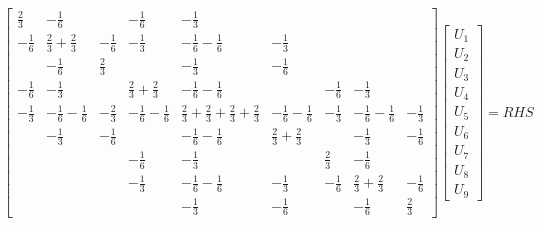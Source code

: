 \begin{equation}
  \begin{bmatrix}
    \frac{2}{3} &-\frac{1}{6} &\frac{}{} &-\frac{1}{6} 
          &-\frac{1}{3} 
          &\frac{}{} &\frac{}{} &\frac{}{} &\frac{}{} \\
    -\frac{1}{6} &\frac{2}{3}+\frac{2}{3} &-\frac{1}{6} &-\frac{1}{3} 
          &-\frac{1}{6}-\frac{1}{6} 
          &-\frac{1}{3} &\frac{}{} &\frac{}{} &\frac{}{} \\
    \frac{}{} &-\frac{1}{6} &\frac{2}{3} &\frac{}{} 
          &-\frac{1}{3} 
          &-\frac{1}{6} &\frac{}{} &\frac{}{} &\frac{}{} \\
    -\frac{1}{6} &-\frac{1}{3} &\frac{}{} &\frac{2}{3}+\frac{2}{3} 
          &-\frac{1}{6}-\frac{1}{6} 
          &\frac{}{} &-\frac{1}{6} &-\frac{1}{3} &\frac{}{} \\
    -\frac{1}{3} &-\frac{1}{6}-\frac{1}{6} &-\frac{2}{3} &-\frac{1}{6}-\frac{1}{6} 
          & \frac{2}{3}+\frac{2}{3}+\frac{2}{3}+\frac{2}{3} 
          & -\frac{1}{6}-\frac{1}{6}
          &-\frac{1}{3} &-\frac{1}{6}-\frac{1}{6} &-\frac{1}{3} \\
    \frac{}{} &-\frac{1}{3} &-\frac{1}{6} &\frac{}{} 
          &-\frac{1}{6}-\frac{1}{6}
          &\frac{2}{3}+\frac{2}{3} &\frac{}{} &-\frac{1}{3} &-\frac{1}{6} \\
    \frac{}{} &\frac{}{} &\frac{}{} &-\frac{1}{6} 
          &-\frac{1}{3} 
          &\frac{}{} &\frac{2}{3} &-\frac{1}{6} &\frac{}{} \\
    \frac{}{} &\frac{}{} &\frac{}{} &-\frac{1}{3} 
          &-\frac{1}{6}-\frac{1}{6} 
          &-\frac{1}{3} &-\frac{1}{6} &\frac{2}{3}+\frac{2}{3} &-\frac{1}{6} \\
    \frac{}{} &\frac{}{} &\frac{}{} &\frac{}{} 
          &-\frac{1}{3} 
          &-\frac{1}{6} &\frac{}{} &-\frac{1}{6} &\frac{2}{3}
  \end{bmatrix}
  \begin{bmatrix}
    U_{1} \\
    U_{2} \\
    U_{3} \\
    U_{4} \\
    U_{5} \\
    U_{6} \\
    U_{7} \\
    U_{8} \\
    U_{9}
  \end{bmatrix}
  = RHS
\end{equation}
